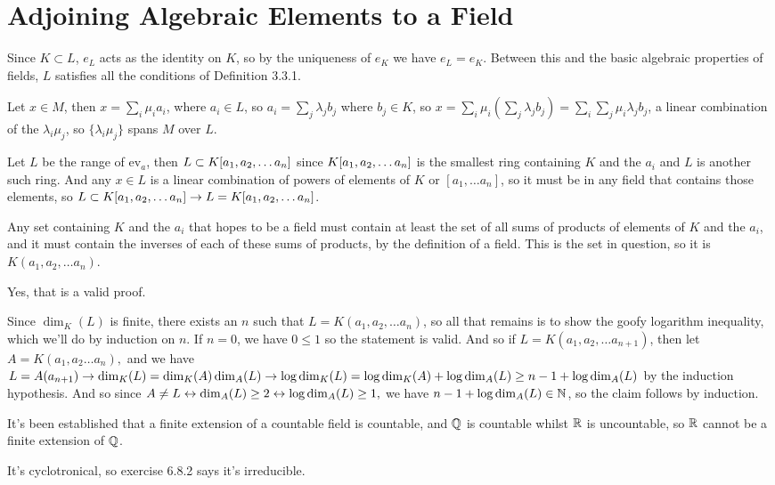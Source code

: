 \documentclass[11pt, oneside]{article}   	%
\begin{document}
\section{Adjoining Algebraic Elements to a Field}
\be
\item Since $K \subset L$, $e_L$ acts as the identity on $K$, so by the uniqueness of $e_K$ we have $e_L = e_K$. Between this and the basic algebraic properties of fields, $L$ satisfies all the conditions of Definition 3.3.1.
\item Let $x \in M$, then $x = \sum_i \mu_ia_i$, where $a_i \in L$, so $a_i = \sum_j \lambda_jb_j$ where $b_j \in K$, so $x = \sum_i \mu_i(\sum_j \lambda_j b_j) = \sum_i\sum_j \mu_i\lambda_jb_j$, a linear combination of the $\lambda_i\mu_j$, so $\{\lambda_i\mu_j\}$ spans $M$ over $L$.
\item Let $L$ be the range of ev$_a$, then $L \subset K[a_1, a_2, \ldots a_n]$ since $K[a_1, a_2, \ldots a_n]$ is the smallest ring containing $K$ and the $a_i$ and $L$ is another such ring. And any $x \in L$ is a linear combination of powers of elements of $K$ or $[a_1, \ldots a_n]$, so it must be in any field that contains those elements, so $L \subset K[a_1, a_2, \ldots a_n] \rightarrow L = K[a_1, a_2, \ldots a_n]$.
\item Any set containing $K$ and the $a_i$ that hopes to be a field must contain at least the set of all sums of products of elements of $K$ and the $a_i$, and it must contain the inverses of each of these sums of products, by the definition of a field. This is the set in question, so it is $K(a_1, a_2, \ldots a_n)$.
\item Yes, that is a valid proof.
\item Since $\dim_K(L)$ is finite, there exists an $n$ such that $L = K(a_1, a_2, \ldots a_n)$, so all that remains is to show the goofy logarithm inequality, which we'll do by induction on $n$. If $n=0$, we have $0\le1$ so the statement is valid. And so if $L = K(a_1, a_2, \ldots a_{n+1})$, then let $A = K(a_1, a_2 \ldots a_n), $ and we have $L = A(a_{n+1}) \rightarrow \dim_K(L) = \dim_K(A)\dim_A(L) \rightarrow \log\dim_K(L) = \log\dim_K(A) + \log\dim_A(L) \ge n - 1 + \log\dim_A(L)$ by the induction hypothesis. And so since $A \not = L \leftrightarrow \dim_A(L) \ge 2 \leftrightarrow \log\dim_A(L) \ge 1,$ we have $n - 1 + \log\dim_A(L) \in \mathbb{N}$, so the claim follows by induction.
\item It's been established that a finite extension of a countable field is countable, and $\mathbb{Q}$ is countable whilst $\mathbb{R}$ is uncountable, so $\mathbb{R}$ cannot be a finite extension of $\mathbb{Q}$.
\item \be
\item It's cyclotronical, so exercise 6.8.2 says it's irreducible.
\end{document}
